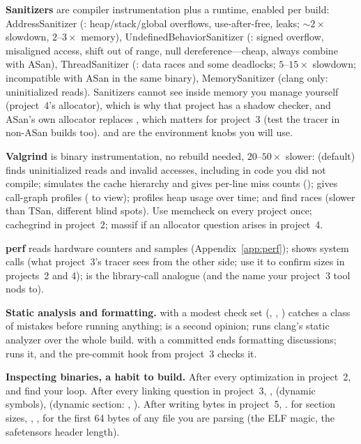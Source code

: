 \textbf{Sanitizers} are compiler instrumentation plus a runtime, enabled per build: AddressSanitizer (: heap/stack/global overflows, use-after-free, leaks; $\sim 2\times$ slowdown, $2$--$3\times$ memory), UndefinedBehaviorSanitizer (: signed overflow, misaligned access, shift out of range, null dereference---cheap, always combine with ASan), ThreadSanitizer (: data races and some deadlocks; $5$--$15\times$ slowdown; incompatible with ASan in the same binary), MemorySanitizer (clang only: uninitialized reads). Sanitizers cannot see inside memory you manage yourself (project~4's allocator), which is why that project has a shadow checker, and ASan's own allocator replaces , which matters for project~3 (test the tracer in non-ASan builds too).  and  are the environment knobs you will use.

\textbf{Valgrind} is binary instrumentation, no rebuild needed, $20$--$50\times$ slower:  (default) finds uninitialized reads and invalid accesses, including in code you did not compile;  simulates the cache hierarchy and gives per-line miss counts ();  gives call-graph profiles ( to view);  profiles heap usage over time;  and  find races (slower than TSan, different blind spots). Use memcheck on every project once; cachegrind in project~2; massif if an allocator question arises in project~4.

\textbf{perf} reads hardware counters and samples (Appendix~\ref{app:perf});  shows system calls (what project~3's tracer sees from the other side; use it to confirm  sizes in projects~2 and 4);  is the library-call analogue (and the name your project~3 tool nods to).

\textbf{Static analysis and formatting.}  with a modest check set (, , ) catches a class of mistakes before running anything;  is a second opinion;  runs clang's static analyzer over the whole build.  with a committed  ends formatting discussions;  runs it, and the pre-commit hook from project~3 checks it.

\textbf{Inspecting binaries, a habit to build.} After every optimization in project~2,  and find your loop. After every linking question in project~3, ,  (dynamic symbols),  (dynamic section: , ). After writing bytes in project~5, .  for section sizes, , ,  for the first 64 bytes of any file you are parsing (the ELF magic, the safetensors header length).

